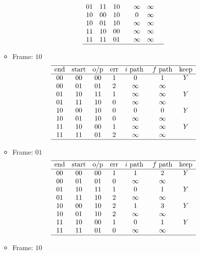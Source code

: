 \documentclass[main.tex]{subfiles}
\begin{document}
\begin{itemize}
\begin{itemize}
\[\begin{array}{ccccccc}
      01 & 11 & 10 & & \infty & \infty & \\
      10 & 00 & 10 & & 0 & \infty & \\
      10 & 01 & 10 & & \infty & \infty & \\
      11 & 10 & 00 & & \infty & \infty & \\
      11 & 11 & 01 & & \infty & \infty & \\
      \hline
    \end{array}
    \]
  \item Frame: $10$
    \[
    \begin{array}{ccccccc}
      \hline
      \text{end} & \text{start} & \text{o/p} & \text{err} & i \text{ path } & f \text{ path} & \text{keep}\\
      \hline
      00 & 00 & 00 & 1 & 0 & 1 & Y\\
      00 & 01 & 01 & 2 & \infty & \infty & \\
      01 & 10 & 11 & 1 & \infty & \infty & Y\\
      01 & 11 & 10 & 0 & \infty & \infty & \\
      10 & 00 & 10 & 0 & 0 & 0 & Y\\
      10 & 01 & 10 & 0 & \infty & \infty & \\
      11 & 10 & 00 & 1 & \infty & \infty & Y\\
      11 & 11 & 01 & 2 & \infty & \infty & \\
      \hline
    \end{array}
    \]
  \item Frame: $01$
    \[
    \begin{array}{ccccccc}
      \hline
      \text{end} & \text{start} & \text{o/p} & \text{err} & i \text{ path } & f \text{ path} & \text{keep}\\
      \hline
      00 & 00 & 00 & 1 & 1 & 2 & Y\\
      00 & 01 & 01 & 0 & \infty & \infty & \\
      01 & 10 & 11 & 1 & 0 & 1 & Y\\
      01 & 11 & 10 & 2 & \infty & \infty & \\
      10 & 00 & 10 & 2 & 1 & 3 & Y\\
      10 & 01 & 10 & 2 & \infty & \infty & \\
      11 & 10 & 00 & 1 & 0 & 1 & Y\\
      11 & 11 & 01 & 0 & \infty & \infty & \\
      \hline
    \end{array}
    \]
  \item Frame: $10$

\end{itemize}
\end{itemize}
\end{document}
